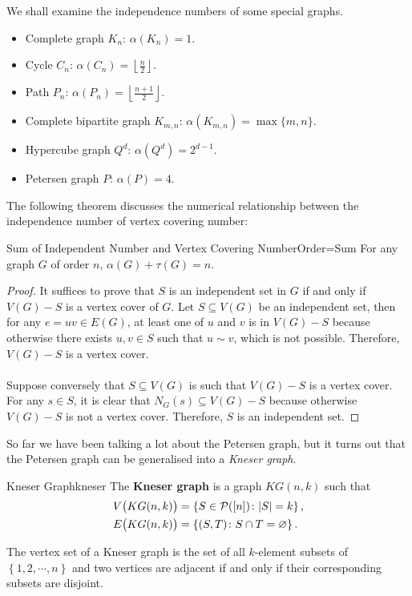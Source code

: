 \documentclass[math]{amznotes}
\theoremstyle{remark}
\newcommand{\0}{\mathbf{0}}
\newcommand{\1}{\mathbf{1}}
\begin{document}
We shall examine the independence numbers of some special graphs.
\begin{itemize}
    \item Complete graph $K_n$: $\alpha(K_n) = 1$.
    \item Cycle $C_n$: $\alpha(C_n) = \left\lfloor\frac{n}{2}\right\rfloor$.
    \item Path $P_n$: $\alpha(P_n) = \left\lfloor\frac{n + 1}{2}\right\rfloor$.
    \item Complete bipartite graph $K_{m, n}$: $\alpha(K_{m, n}) = \max\{m, n\}$.
    \item Hypercube graph $Q^d$: $\alpha(Q^d) = 2^{d - 1}$.
    \item Petersen graph $P$: $\alpha(P) = 4$.
\end{itemize}
The following theorem discusses the numerical relationship between the independence number of vertex covering number:
\begin{probox}{Sum of Independent Number and Vertex Covering Number}{Order=Sum}
    For any graph $G$ of order $n$, $\alpha(G) + \tau(G) = n$.
    \tcblower
    \begin{proof}
        It suffices to prove that $S$ is an independent set in $G$ if and only if $V(G) - S$ is a vertex cover of $G$. Let $S \subseteq V(G)$ be an independent set, then for any $e = uv \in E(G)$, at least one of $u$ and $v$ is in $V(G) - S$ because otherwise there exists $u, v \in S$ such that $u \sim v$, which is not possible. Therefore, $V(G) - S$ is a vertex cover.
        \\\\
        Suppose conversely that $S \subseteq V(G)$ is such that $V(G) - S$ is a vertex cover. For any $s \in S$, it is clear that $N_G\left(s\right) \subseteq V\left(G\right) - S$ because otherwise $V\left(G\right) - S$ is not a vertex cover. Therefore, $S$ is an independent set.
    \end{proof}
\end{probox}
So far we have been talking a lot about the Petersen graph, but it turns out that the Petersen graph can be generalised into a \textit{Kneser graph}.
\begin{dfnbox}{Kneser Graph}{kneser}
    The {\color{red} \textbf{Kneser graph}} is a graph $KG(n, k)$ such that 
    \begin{align*}
        V\bigl(KG(n, k)\bigr) & = \left\{S \in \mathcal{P}([n]) \colon {\left\lvert {S} \right\rvert} = k\right\}, \\
        E\bigl(KG(n, k)\bigr) & = \left\{(S, T) \colon S \cap T = \varnothing\right\}.
    \end{align*}
\end{dfnbox}
The vertex set of a Kneser graph is the set of all $k$-element subsets of $\left\{1, 2, \cdots, n\right\}$ and two vertices are adjacent if and only if their corresponding subsets are disjoint.
\end{document}
